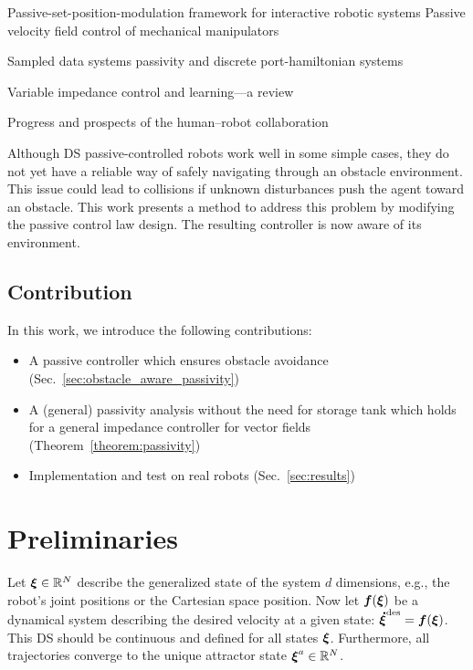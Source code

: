 \documentclass[conference]{IEEEtran}
\begin{document}
Passive-set-position-modulation framework for interactive robotic systems
\cite{lee2010passive}
Passive velocity field control of mechanical manipulators
\cite{li1999passive}

Sampled data systems passivity and discrete port-hamiltonian systems
\cite{stramigioli2005sampled}

Variable impedance control and learning—a review
\cite{abu2020variable}

Progress and prospects of the human--robot collaboration
\cite{ajoudani2018progress}


Although DS passive-controlled robots work well in some simple cases, they do not yet have a reliable way of safely navigating through an obstacle environment. This issue could lead to collisions if unknown disturbances push the agent toward an obstacle. This work presents a method to address this problem by modifying the passive control law design. The resulting controller is now aware of its environment.

\subsection{Contribution}
In this work, we introduce the following contributions:
\begin{itemize}
\item A passive controller which ensures obstacle avoidance (Sec.~\ref{sec:obstacle_aware_passivity})
\item A (general) passivity analysis  without the need for storage tank which holds for a general impedance controller for vector fields (Theorem~\ref{theorem:passivity})
\item Implementation and test on real robots (Sec.~\ref{sec:results})
\end{itemize}

\section{Preliminaries}
Let $\boldsymbol{\xi} \in \mathbb{R}^N$ describe the generalized state of the system $d$ dimensions, e.g., the robot's joint positions or the Cartesian space position.
Now let $\boldsymbol{f}(\boldsymbol{\xi})$ be a dynamical system describing the desired velocity at a given state: $\boldsymbol{\dot\xi}^{\mathrm{des}} = \boldsymbol{f}( \boldsymbol{\xi})$.
This DS should be continuous and defined for all states $\boldsymbol{\xi}$. Furthermore, all trajectories converge to the unique attractor state $\boldsymbol{\xi} ^a \in \mathbb{R}^N$. 
\end{document}
